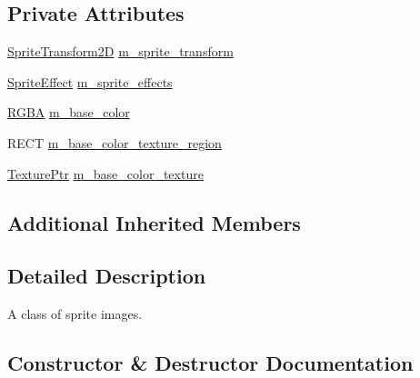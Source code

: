 \subsection*{Private Attributes}
\begin{DoxyCompactItemize}
\item 
\mbox{\hyperlink{classmage_1_1_sprite_transform2_d}{Sprite\+Transform2D}} \mbox{\hyperlink{classmage_1_1rendering_1_1_sprite_image_a03355647f19e8e9545fde87999331de3}{m\+\_\+sprite\+\_\+transform}}
\item 
\mbox{\hyperlink{namespacemage_1_1rendering_a4dbc3536c87b906f1d41d863ec458e78}{Sprite\+Effect}} \mbox{\hyperlink{classmage_1_1rendering_1_1_sprite_image_a25891d2cfd1edd3dc86c0bc82700cad2}{m\+\_\+sprite\+\_\+effects}}
\item 
\mbox{\hyperlink{structmage_1_1_r_g_b_a}{R\+G\+BA}} \mbox{\hyperlink{classmage_1_1rendering_1_1_sprite_image_a9f17f78cd6731bc604daa2b4f2593435}{m\+\_\+base\+\_\+color}}
\item 
R\+E\+CT \mbox{\hyperlink{classmage_1_1rendering_1_1_sprite_image_a18de0a4473e2bfee074cd152d1ba2c3e}{m\+\_\+base\+\_\+color\+\_\+texture\+\_\+region}}
\item 
\mbox{\hyperlink{namespacemage_1_1rendering_a6f3ae54f825328465b0cdde0f0de4a36}{Texture\+Ptr}} \mbox{\hyperlink{classmage_1_1rendering_1_1_sprite_image_a1b68c232550bfc55aa794fcffbeab489}{m\+\_\+base\+\_\+color\+\_\+texture}}
\end{DoxyCompactItemize}
\subsection*{Additional Inherited Members}


\subsection{Detailed Description}
A class of sprite images. 

\subsection{Constructor \& Destructor Documentation}
\mbox{\label{classmage_1_1rendering_1_1_sprite_image_af49f06e0de889dbfd2db264d9e07fc20}} 
